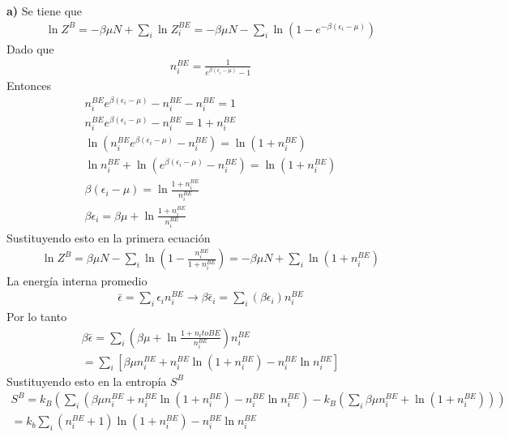 \documentclass{article}
\begin{document}
\textbf{a) } Se tiene que 
\begin{gather*}
  \ln Z^B = - \beta\mu N + \displaystyle\sum_{i }^{} \ln Z_i ^ {BE } = - \beta\mu N - \displaystyle\sum_{i }^{} \ln (1 - e ^ {- \beta(\epsilon_i - \mu)})
\end{gather*}
Dado que 
\begin{gather*}
  n_i ^ {BE } = \frac{1}{e ^ {\beta(\epsilon_i - \mu)} - 1 } 
\end{gather*}
Entonces 
\begin{gather*}
  n_i ^ {BE } e ^ {\beta(\epsilon_i - \mu)} - n_i ^ {BE } - n_i ^ {BE } = 1 \\
  n_i ^ {BE } e ^ {\beta(\epsilon_i - \mu)} - n_i ^ {BE } = 1 + n_i ^ {BE } \\
  \ln (n_i ^ {BE } e ^ {\beta(\epsilon_i - \mu)} - n_i ^ {BE } ) = \ln (1 + n_i ^ {BE }) \\
  \ln n_i ^ {BE }  + \ln (e ^ {\beta(\epsilon_i - \mu)} - n_i ^ {BE }) = \ln (1 + n_i ^ {BE }) \\
  \beta(\epsilon_i - \mu) = \ln \frac{1 + n_i^{BE }}{n_i^{BE }} \\
  \beta\epsilon_i = \beta \mu + \ln \frac{1 + n_i^{BE }}{n_i^{BE }}
\end{gather*}
Sustituyendo esto en la primera ecuación 
\begin{gather*}
  \ln Z^B = \beta\mu N - \displaystyle\sum_{i }^{} \ln \left(1 - \frac{n_i ^ {BE }}{1 + n_i ^ {BE }}\right) = - \beta\mu N + \displaystyle\sum_{i }^{} \ln (1 + n_i ^ {BE }) 
\end{gather*}
La energía interna promedio 
\begin{gather*}
  \bar \epsilon  = \displaystyle\sum_{i }^{} \epsilon_i n_i ^ {BE } \rightarrow \beta\bar\epsilon_i = \displaystyle\sum_{i }^{} (\beta\epsilon_i ) n_i ^ {BE }
\end{gather*}
Por lo tanto 
\begin{gather*}
  \beta\bar \epsilon = \displaystyle\sum_{i }^{} \left(\beta\mu + \ln \frac{1 + n_i to
  BE }{n_i ^ {BE }}\right)n_i ^ {BE }\\
  = \displaystyle\sum_{i }^{} \left[\beta\mu n_i ^ {BE } + n_i ^ {BE } \ln (1 + n_i ^ {BE }) - n_i ^ {BE }\ln n_i ^ {BE }\right]
\end{gather*}
Sustituyendo esto en la entropía $ S^B $ 
\begin{gather*}
  S^B = k_B \left(\displaystyle\sum_{i }^{} (\beta\mu n_i ^ {BE } + n_i ^ {BE } \ln ( 1 + n_i ^ {BE }) - n_i ^ {BE } \ln n_i ^ {BE }) - k_B (\displaystyle\sum_{i }^{} \beta\mu n_i ^ {BE } + \ln (1 + n_i ^ {BE }))\right) \\
  = k_b \displaystyle\sum_{i }^{} ( n_i ^ {BE } + 1 ) \ln ( 1 + n_i ^ {BE }) - n_i ^ {BE } \ln n_i ^ {BE }
\end{gather*}
\end{document}
